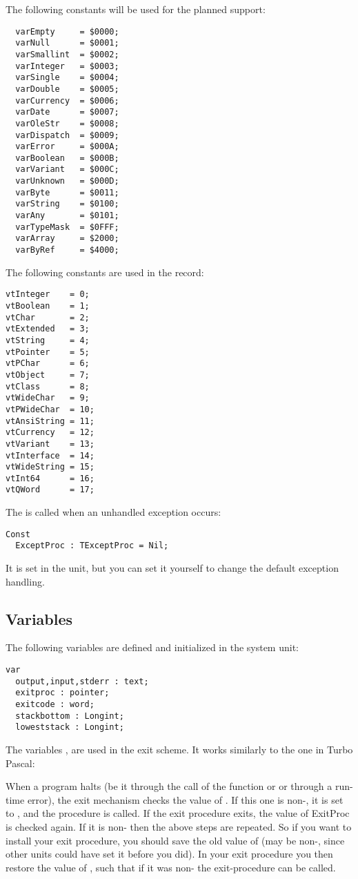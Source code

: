 \documentclass{report}
\begin{document}
The following constants will be used for the planned  support:
\begin{verbatim}
  varEmpty     = $0000;
  varNull      = $0001;
  varSmallint  = $0002;
  varInteger   = $0003;
  varSingle    = $0004;
  varDouble    = $0005;
  varCurrency  = $0006;
  varDate      = $0007;
  varOleStr    = $0008;
  varDispatch  = $0009;
  varError     = $000A;
  varBoolean   = $000B;
  varVariant   = $000C;
  varUnknown   = $000D;
  varByte      = $0011;
  varString    = $0100;
  varAny       = $0101;
  varTypeMask  = $0FFF;
  varArray     = $2000;
  varByRef     = $4000;
\end{verbatim}
The following constants are used in the  record:
\begin{verbatim}
vtInteger    = 0;
vtBoolean    = 1;          
vtChar       = 2; 
vtExtended   = 3; 
vtString     = 4; 
vtPointer    = 5; 
vtPChar      = 6; 
vtObject     = 7; 
vtClass      = 8; 
vtWideChar   = 9; 
vtPWideChar  = 10;
vtAnsiString = 11;
vtCurrency   = 12;
vtVariant    = 13;
vtInterface  = 14;
vtWideString = 15;
vtInt64      = 16;
vtQWord      = 17;
\end{verbatim}
The  is called when an unhandled exception occurs:
\begin{verbatim}
Const
  ExceptProc : TExceptProc = Nil;
\end{verbatim}
It is set in the  unit, but you can set it yourself to change
the default exception handling.

\subsection{Variables}
The following variables are defined and initialized in the system unit:
\begin{verbatim}
var
  output,input,stderr : text;
  exitproc : pointer;
  exitcode : word;
  stackbottom : Longint;
  loweststack : Longint;
\end{verbatim}
The variables ,  are used in the \fpc exit
scheme. It works similarly to the one in Turbo Pascal:

When a program halts (be it through the call of the  function or
 or through a run-time error), the exit mechanism checks the value
of . If this one is non-, it is set to , and
the procedure is called. If the exit procedure exits, the value of ExitProc
is checked again. If it is non- then the above steps are repeated.
So if you want to install your exit procedure, you should save the old value
of  (may be non-, since other units could have set it before
you did). In your exit procedure you then restore the value of
, such that if it was non- the exit-procedure can be
called.
\end{document}

